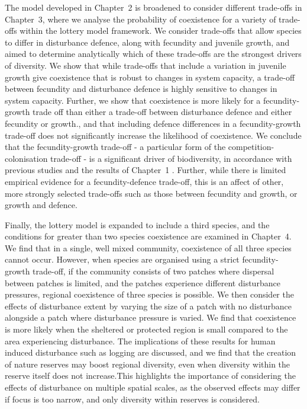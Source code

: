 The model developed in Chapter~2 is broadened to consider different trade-offs in Chapter~3, where we analyse the probability of coexistence for a variety of trade-offs within the lottery model framework. We consider trade-offs that allow species to differ in disturbance defence, along with fecundity and juvenile growth, and aimed to determine analytically which of these trade-offs are the strongest drivers of diversity. We show that while trade-offs that include a variation in juvenile growth give coexistence that is robust to changes in system capacity, a trade-off between fecundity and disturbance defence is highly sensitive to changes in system capacity. Further, we show that coexistence is more likely for a fecundity-growth trade off than either a trade-off between disturbance defence and either fecundity or growth., and that including defence differences in a fecundity-growth trade-off does not significantly increase the likelihood of coexistence. We conclude that the fecundity-growth trade-off - a particular form of the competition-colonisation trade-off - is a significant driver of biodiversity, in accordance with previous studies and the results of Chapter~1 \citep[e.g.][]{adler2000space,nattrass2012quantifying,tilman1994competition}. Further, while there is limited empirical evidence for a fecundity-defence trade-off, this is an affect of other, more strongly selected trade-offs such as those between fecundity and growth, or growth and defence.

Finally, the lottery model is expanded to include a third species, and the conditions for greater than two species coexistence are examined in Chapter~4. We find that in a single, well mixed community, coexistence of all three species cannot occur. However, when species are organised using a strict fecundity-growth trade-off, if the community consists of two patches where dispersal between patches is limited, and the patches experience different disturbance pressures, regional coexistence of three species is possible. We then consider the effects of disturbance extent by varying the size of a patch with no disturbance alongside a patch where disturbance pressure is varied. We find that coexistence is more likely when the sheltered or protected region is small compared to the area experiencing disturbance. The implications of these results for human induced disturbance such as logging are discussed, and we find that the creation of nature reserves may boost regional diversity, even when diversity within the reserve itself does not increase.This highlights the importance of considering the effects of disturbance on multiple spatial scales, as the observed effects may differ if focus is too narrow, and only diversity within reserves is considered.

